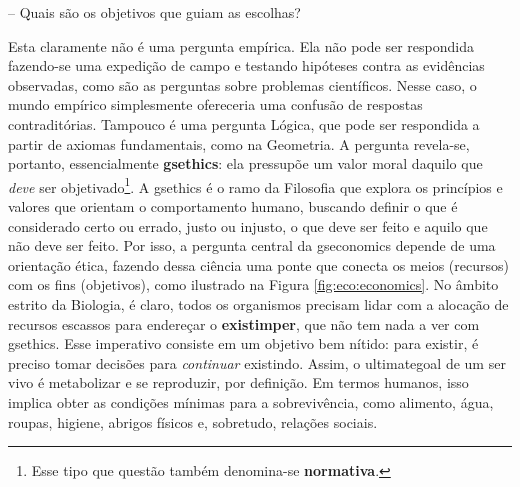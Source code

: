 \documentclass[./main.tex]{subfiles}
\begin{document}
-- Quais são os objetivos que guiam as escolhas?

\noindent Esta claramente não é uma pergunta empírica. Ela não pode ser respondida fazendo-se uma expedição de campo e testando hipóteses contra as evidências observadas, como são as perguntas sobre problemas científicos. Nesse caso, o mundo empírico simplesmente ofereceria uma confusão de respostas contraditórias. Tampouco é uma pergunta Lógica, que pode ser respondida a partir de axiomas fundamentais, como na Geometria. A pergunta revela-se, portanto, essencialmente \textbf{\gls{gsethics}}: ela pressupõe um valor moral daquilo que \textit{deve} ser objetivado\footnote{Esse tipo que questão também denomina-se \textbf{normativa}.}. A \gls{gsethics} é o ramo da Filosofia que explora os princípios e valores que orientam o comportamento humano, buscando definir o que é considerado certo ou errado, justo ou injusto, o que deve ser feito e aquilo que não deve ser feito. Por isso, a pergunta central da \gls{gseconomics} depende de uma orientação ética, fazendo dessa ciência uma ponte que conecta os meios (recursos) com os fins (objetivos), como ilustrado na Figura \ref{fig:eco:economics}. No âmbito estrito da Biologia, é claro, todos os organismos precisam lidar com a alocação de recursos escassos para endereçar o \textbf{\gls{existimper}}, que não tem nada a ver com \gls{gsethics}. Esse imperativo consiste em um objetivo bem nítido: para existir, é preciso tomar decisões para \textit{continuar} existindo. Assim, o \gls{ultimategoal} de um ser vivo é metabolizar e se reproduzir, por definição. Em termos humanos, isso implica obter as condições mínimas para a sobrevivência, como alimento, água, roupas, higiene, abrigos físicos e, sobretudo, relações sociais.
\end{document}
